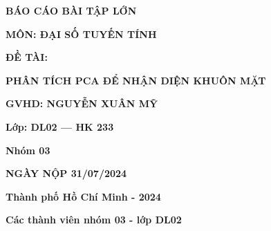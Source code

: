 \documentclass[12pt,a4paper]{article}
\begin{document}
\begin{titlepage}
\begin{center}
        \vspace{10pt}
        \fontsize{18pt}{17pt}\selectfont 
        \textbf{BÁO CÁO BÀI TẬP LỚN} 
        
        \vspace{7pt}
        \textbf{MÔN: ĐẠI SỐ TUYẾN TÍNH}
    \end{center}
    
    \begin{center}
        \fontsize{17pt}{17pt}\selectfont 
        \textcolor{Danube}{\textbf{\textrm{ĐỀ TÀI:}}}
    \end{center}

    \begin{center}
        \fontsize{17pt}{17pt}\selectfont 
        \textcolor{Danube}{\textbf{\textrm{PHÂN TÍCH PCA ĐỂ NHẬN DIỆN KHUÔN MẶT}}}
    \end{center}
    
    \begin{center}
        \vspace{15pt}
    \textbf{GVHD: NGUYỄN XUÂN MỸ}
    \end{center}

    \begin{center}
        \vspace{15pt}
    \textbf{Lớp: DL02 --- HK 233}
    \end{center}
    
    \begin{center}
    \vspace{15pt}
    \textbf{Nhóm 03}
    \end{center}
    
    \begin{center}
        \vspace{10pt}
        \textbf{NGÀY NỘP 31/07/2024}
    \end{center}

    
    \vfill
    \centerline{\bf Thành phố Hồ Chí Minh - 2024}
    
    \vspace{1cm}
\end{titlepage}
\newpage
\begin{center}
    \textbf{Các thành viên nhóm 03 - lớp DL02}
\end{center}
\end{document}
